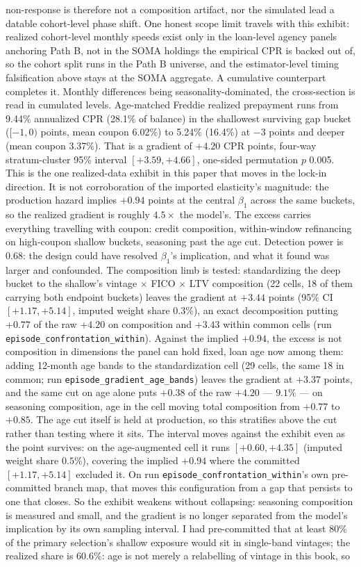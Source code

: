 \documentclass[12pt]{article}
\begin{document}
non-response is therefore not a composition artifact, nor the simulated lead a datable cohort-level phase shift. One honest scope limit travels with this exhibit: realized cohort-level monthly speeds exist only in the loan-level agency panels anchoring Path B, not in the SOMA holdings the empirical CPR is backed out of, so the cohort split runs in the Path B universe, and the estimator-level timing falsification above stays at the SOMA aggregate. A cumulative counterpart completes it. Monthly differences being seasonality-dominated, the cross-section is read in cumulated levels. Age-matched Freddie realized prepayment runs from 9.44\% annualized CPR (28.1\% of balance) in the shallowest surviving gap bucket ($[-1,0)$ points, mean coupon 6.02\%) to 5.24\% (16.4\%) at $-3$ points and deeper (mean coupon 3.37\%). That is a gradient of $+4.20$ CPR points, four-way stratum-cluster 95\% interval $[+3.59, +4.66]$, one-sided permutation $p$ 0.005. This is the one realized-data exhibit in this paper that moves in the lock-in direction. It is not corroboration of the imported elasticity's magnitude: the production hazard implies $+0.94$ points at the central $\beta_1$ across the same buckets, so the realized gradient is roughly $4.5\times$ the model's. The excess carries everything travelling with coupon: credit composition, within-window refinancing on high-coupon shallow buckets, seasoning past the age cut. Detection power is 0.68: the design could have resolved $\beta_1$'s implication, and what it found was larger and confounded. The composition limb is tested: standardizing the deep bucket to the shallow's vintage $\times$ FICO $\times$ LTV composition (22 cells, 18 of them carrying both endpoint buckets) leaves the gradient at $+3.44$ points (95\% CI $[+1.17, +5.14]$, imputed weight share $0.3\%$), an exact decomposition putting $+0.77$ of the raw $+4.20$ on composition and $+3.43$ within common cells (run \texttt{episode\_confrontation\_within}). Against the implied $+0.94$, the excess is not composition in dimensions the panel can hold fixed, loan age now among them: adding 12-month age bands to the standardization cell (29 cells, the same 18 in common; run \texttt{episode\_gradient\_age\_bands}) leaves the gradient at $+3.37$ points, and the same cut on age alone puts $+0.38$ of the raw $+4.20$ --- $9.1\%$ --- on seasoning composition, age in the cell moving total composition from $+0.77$ to $+0.85$. The age cut itself is held at production, so this stratifies above the cut rather than testing where it sits. The interval moves against the exhibit even as the point survives: on the age-augmented cell it runs $[+0.60, +4.35]$ (imputed weight share $0.5\%$), covering the implied $+0.94$ where the committed $[+1.17, +5.14]$ excluded it. On run \texttt{episode\_confrontation\_within}'s own pre-committed branch map, that moves this configuration from a gap that persists to one that closes. So the exhibit weakens without collapsing: seasoning composition is measured and small, and the gradient is no longer separated from the model's implication by its own sampling interval. I had pre-committed that at least $80\%$ of the primary selection's shallow exposure would sit in single-band vintages; the realized share is $60.6\%$: age is not merely a relabelling of vintage in this book, so 
\end{document}
